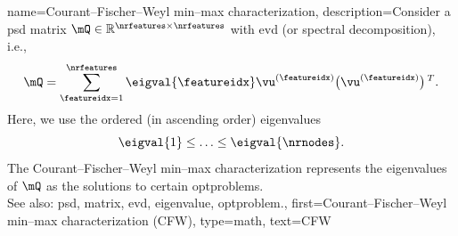 {name={Courant–Fischer–Weyl min–max characterization}, 
	description={Consider a \gls{psd} 
		\gls{matrix} $\mQ \in \mathbb{R}^{\nrfeatures \times \nrfeatures}$ with 
		\gls{evd} (or spectral decomposition), i.e.,
		$$\mQ = \sum_{\featureidx=1}^{\nrfeatures} \eigval{\featureidx} \vu^{(\featureidx)} \big(  \vu^{(\featureidx)}  \big)\,^{T}.$$ 
		Here, we use the ordered (in ascending order) \glspl{eigenvalue} 
		\begin{equation}
			\nonumber
		 	\eigval{1}  \leq \ldots \leq \eigval{\nrnodes}. 
		\end{equation}
		The Courant–Fischer–Weyl min–max characterization \cite[Th. 8.1.2]{GolubVanLoanBook} 
		represents the \glspl{eigenvalue} of $\mQ$ as the solutions to certain \glspl{optproblem}.
			\\
		See also: \gls{psd}, \gls{matrix}, \gls{evd}, \gls{eigenvalue}, \gls{optproblem}.}, 
	first={Courant–Fischer–Weyl min–max characterization (CFW)}, 
	type=math,
	text={CFW}
}

